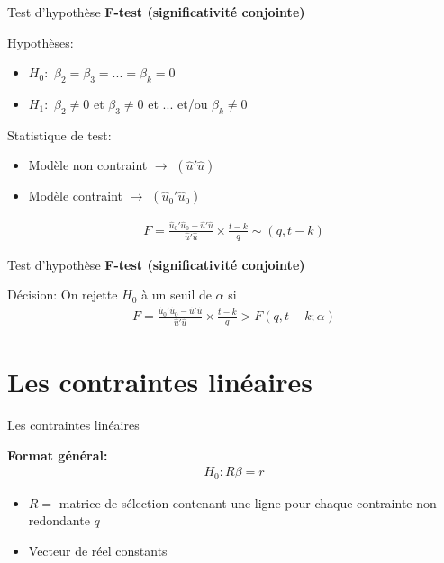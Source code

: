 \documentclass{beamer}
\begin{document}
\begin{frame}{Test d'hypothèse}
\textbf{F-test (significativité conjointe)}
\begin{block}{Hypothèses:}
\begin{itemize}
\item $H_0:$ $\beta_2 = \beta_3 = ... = \beta_k=0$
\item $H_1:$ $\beta_2 \neq 0$ et $\beta_3 \neq 0$ et $...$ et/ou $\beta_k \neq 0$
\end{itemize}
\end{block}
\begin{block}{Statistique de test:}
\begin{itemize}
\item Modèle non contraint $\rightarrow$ $(\hat{u}'\hat{u})$
\item Modèle contraint $\rightarrow$ $(\hat{u}_0'\hat{u}_0)$
\end{itemize}
\begin{align*}
F = \frac{\hat{u}_0'\hat{u}_0-\hat{u}'\hat{u}}{\hat{u}'\hat{u}}\times \frac{t-k}{q} \sim (q,t-k)
\end{align*}
\end{block}
\end{frame}

\begin{frame}{Test d'hypothèse}
\textbf{F-test (significativité conjointe)}

\begin{block}{Décision:}
On rejette $H_0$ à un seuil de $\alpha$ si 
\begin{align*}
F = \frac{\hat{u}_0'\hat{u}_0-\hat{u}'\hat{u}}{\hat{u}'\hat{u}} \times \frac{t-k}{q} > F(q,t-k;\alpha)
\end{align*}
\end{block}
\end{frame}


\section{Les contraintes linéaires}

\frame{\tableofcontents[current]}

\begin{frame}{Les contraintes linéaires}

\textbf{Format général:}
\begin{align*}
H_0: R \beta = r
\end{align*}
\begin{itemize}
\item $R=$ matrice de sélection contenant une ligne pour chaque contrainte non redondante $q$
\item Vecteur de réel constants
\end{itemize}


\end{frame}
\end{document}
